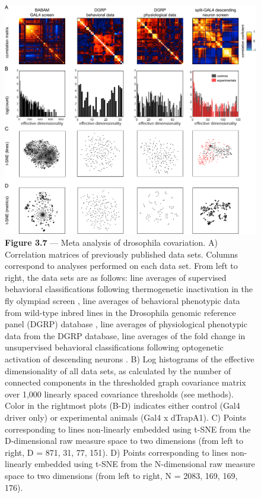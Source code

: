 \documentclass[12pt,letterpaper]{article}
\begin{document}
\begin{figure}[t!]
    \includegraphics[width=\textwidth]{../figures/chapter_3/fig_3-7.pdf}
    \vspace{.05in}
    \caption*{\textbf{Figure 3.7} — Meta analysis of drosophila covariation. A) Correlation matrices of previously published data sets. Columns correspond to analyses performed on each data set. From left to right, the data sets are as follows: line averages of supervised behavioral classifications following thermogenetic inactivation in the fly olympiad screen \cite{Robie_Mapping_2017}, line averages of behavioral phenotypic data from wild-type inbred lines in the Drosophila genomic reference panel (DGRP) database \cite{Mackay_The_2012}, line averages of physiological phenotypic data from the DGRP database, line averages of the fold change in unsupervised behavioral classifications following optogenetic activation of descending neurons \cite{Cande_Optogenetic_2018}. B) Log histograms of the effective dimensionality of all data sets, as calculated by the number of connected components in the thresholded graph covariance matrix over 1,000 linearly spaced covariance thresholds (see methods). Color in the rightmost plots (B-D) indicates either control (Gal4 driver only) or experimental animals (Gal4 x dTrapA1). C) Points corresponding to lines non-linearly embedded using t-SNE from the D-dimensional raw measure space to two dimensions (from left to right, D = 871, 31, 77, 151). D) Points corresponding to lines non-linearly embedded using t-SNE from the N-dimensional raw measure space to two dimensions (from left to right, N = 2083, 169, 169, 176).}
\end{figure}
\end{document}
